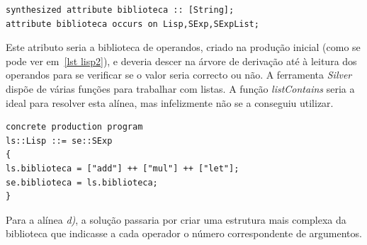 \documentclass[11pt,a4paper]{article}
\begin{document}
\begin{lstlisting}[frame=single, numbers=right, basicstyle=\tiny, caption={Parte do código onde se define o atributo biblioteca}, label={lst lisp}]
synthesized attribute biblioteca :: [String];
attribute biblioteca occurs on Lisp,SExp,SExpList;
\end{lstlisting}

Este atributo seria a biblioteca de operandos, criado na produção inicial (como se pode ver em~\ref{lst lisp2}), e deveria descer na árvore de derivação até à leitura dos operandos para se verificar se o valor seria correcto ou não. A ferramenta \emph{Silver} dispõe de várias funções para trabalhar com listas. A função \emph{listContains} seria a ideal para resolver esta alínea, mas infelizmente não se a conseguiu utilizar.

\begin{lstlisting}[frame=single, numbers=right, basicstyle=\tiny, caption={Parte do código para a criação da biblioteca}, label={lst lisp2}]
concrete production program
ls::Lisp ::= se::SExp
{
ls.biblioteca = ["add"] ++ ["mul"] ++ ["let"];
se.biblioteca = ls.biblioteca;
}
\end{lstlisting}

Para a alínea \emph{d)}, a solução passaria por criar uma estrutura mais complexa da biblioteca que indicasse a cada operador o número correspondente de argumentos.
\end{document}

